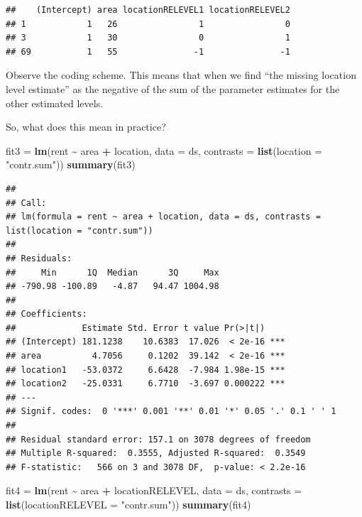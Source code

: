 \documentclass[
]{article}
\newenvironment{Shaded}{\begin{snugshade}}{\end{snugshade}}
\newcommand{\AttributeTok}[1]{\textcolor[rgb]{0.13,0.29,0.53}{#1}}
\newcommand{\FunctionTok}[1]{\textcolor[rgb]{0.13,0.29,0.53}{\textbf{#1}}}
\newcommand{\NormalTok}[1]{#1}
\newcommand{\OtherTok}[1]{\textcolor[rgb]{0.56,0.35,0.01}{#1}}
\newcommand{\SpecialCharTok}[1]{\textcolor[rgb]{0.81,0.36,0.00}{\textbf{#1}}}
\newcommand{\StringTok}[1]{\textcolor[rgb]{0.31,0.60,0.02}{#1}}
\begin{document}
\begin{verbatim}
##    (Intercept) area locationRELEVEL1 locationRELEVEL2
## 1            1   26                1                0
## 3            1   30                0                1
## 69           1   55               -1               -1
\end{verbatim}

Observe the coding scheme. This means that when we find ``the missing
location level estimate'' as the negative of the sum of the parameter
estimates for the other estimated levels.

So, what does this mean in practice?

\begin{Shaded}
\begin{Highlighting}[]
\NormalTok{fit3 }\OtherTok{=} \FunctionTok{lm}\NormalTok{(rent }\SpecialCharTok{\textasciitilde{}}\NormalTok{ area }\SpecialCharTok{+}\NormalTok{ location, }\AttributeTok{data =}\NormalTok{ ds, }\AttributeTok{contrasts =} \FunctionTok{list}\NormalTok{(}\AttributeTok{location =} \StringTok{"contr.sum"}\NormalTok{))}
\FunctionTok{summary}\NormalTok{(fit3)}
\end{Highlighting}
\end{Shaded}

\begin{verbatim}
## 
## Call:
## lm(formula = rent ~ area + location, data = ds, contrasts = list(location = "contr.sum"))
## 
## Residuals:
##     Min      1Q  Median      3Q     Max 
## -790.98 -100.89   -4.87   94.47 1004.98 
## 
## Coefficients:
##             Estimate Std. Error t value Pr(>|t|)    
## (Intercept) 181.1238    10.6383  17.026  < 2e-16 ***
## area          4.7056     0.1202  39.142  < 2e-16 ***
## location1   -53.0372     6.6428  -7.984 1.98e-15 ***
## location2   -25.0331     6.7710  -3.697 0.000222 ***
## ---
## Signif. codes:  0 '***' 0.001 '**' 0.01 '*' 0.05 '.' 0.1 ' ' 1
## 
## Residual standard error: 157.1 on 3078 degrees of freedom
## Multiple R-squared:  0.3555, Adjusted R-squared:  0.3549 
## F-statistic:   566 on 3 and 3078 DF,  p-value: < 2.2e-16
\end{verbatim}

\begin{Shaded}
\begin{Highlighting}[]
\NormalTok{fit4 }\OtherTok{=} \FunctionTok{lm}\NormalTok{(rent }\SpecialCharTok{\textasciitilde{}}\NormalTok{ area }\SpecialCharTok{+}\NormalTok{ locationRELEVEL, }\AttributeTok{data =}\NormalTok{ ds, }\AttributeTok{contrasts =} \FunctionTok{list}\NormalTok{(}\AttributeTok{locationRELEVEL =} \StringTok{"contr.sum"}\NormalTok{))}
\FunctionTok{summary}\NormalTok{(fit4)}
\end{Highlighting}
\end{Shaded}
\end{document}
